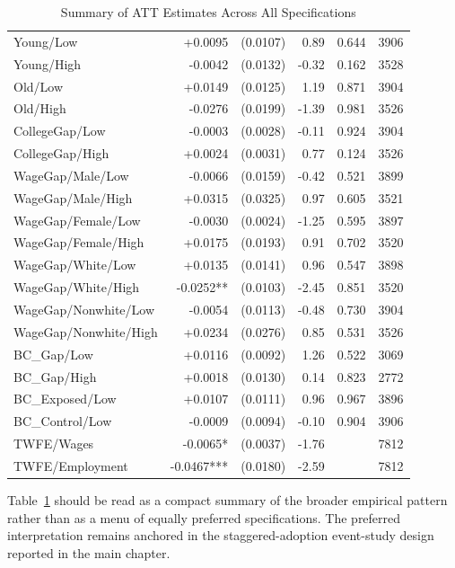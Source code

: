 \begin{table}[ht]
\begin{tabular}{lrrrrr}
  Young/Low & +0.0095 & (0.0107) & 0.89 & 0.644 & 3906 \\ 
  Young/High & -0.0042 & (0.0132) & -0.32 & 0.162 & 3528 \\ 
  Old/Low & +0.0149 & (0.0125) & 1.19 & 0.871 & 3904 \\ 
  Old/High & -0.0276 & (0.0199) & -1.39 & 0.981 & 3526 \\ 
  CollegeGap/Low & -0.0003 & (0.0028) & -0.11 & 0.924 & 3904 \\ 
  CollegeGap/High & +0.0024 & (0.0031) & 0.77 & 0.124 & 3526 \\ 
  WageGap/Male/Low & -0.0066 & (0.0159) & -0.42 & 0.521 & 3899 \\ 
  WageGap/Male/High & +0.0315 & (0.0325) & 0.97 & 0.605 & 3521 \\ 
  WageGap/Female/Low & -0.0030 & (0.0024) & -1.25 & 0.595 & 3897 \\ 
  WageGap/Female/High & +0.0175 & (0.0193) & 0.91 & 0.702 & 3520 \\ 
  WageGap/White/Low & +0.0135 & (0.0141) & 0.96 & 0.547 & 3898 \\ 
  WageGap/White/High & -0.0252** & (0.0103) & -2.45 & 0.851 & 3520 \\ 
  WageGap/Nonwhite/Low & -0.0054 & (0.0113) & -0.48 & 0.730 & 3904 \\ 
  WageGap/Nonwhite/High & +0.0234 & (0.0276) & 0.85 & 0.531 & 3526 \\ 
  BC_Gap/Low & +0.0116 & (0.0092) & 1.26 & 0.522 & 3069 \\ 
  BC_Gap/High & +0.0018 & (0.0130) & 0.14 & 0.823 & 2772 \\ 
  BC_Exposed/Low & +0.0107 & (0.0111) & 0.96 & 0.967 & 3896 \\ 
  BC_Control/Low & -0.0009 & (0.0094) & -0.10 & 0.904 & 3906 \\ 
  TWFE/Wages & -0.0065* & (0.0037) & -1.76 &  & 7812 \\ 
  TWFE/Employment & -0.0467*** & (0.0180) & -2.59 &  & 7812 \\ 
   \bottomrule
\end{tabular}
\caption{Summary of ATT Estimates Across All Specifications} 
\label{tab:att_master}
\end{table}


Table~\ref{tab:att_master} should be read as a compact summary of the broader empirical pattern rather than as a menu of equally preferred specifications. The preferred interpretation remains anchored in the staggered-adoption event-study design reported in the main chapter.

